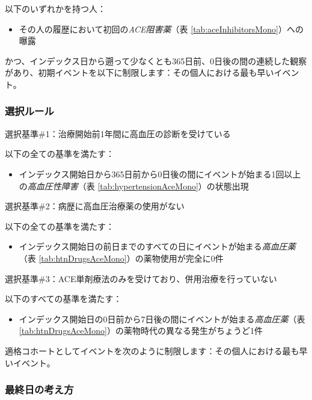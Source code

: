 \documentclass[
  11pt]{book}
\providecommand{\tightlist}{%
  \setlength{\itemsep}{0pt}\setlength{\parskip}{0pt}}
\theoremstyle{definition}
\theoremstyle{definition}
\theoremstyle{definition}
\theoremstyle{definition}
\theoremstyle{remark}
\begin{document}
以下のいずれかを持つ人：

\begin{itemize}
\tightlist
\item
  その人の履歴において初回の\emph{ACE阻害薬}（表 \ref{tab:aceInhibitorsMono}）への曝露
\end{itemize}

かつ、インデックス日から遡って少なくとも365日前、0日後の間の連続した観察があり、初期イベントを以下に制限します：その個人における最も早いイベント。

\subsubsection*{選択ルール}\label{ux9078ux629eux30ebux30fcux30eb}

選択基準\#1：治療開始前1年間に高血圧の診断を受けている

以下の全ての基準を満たす：

\begin{itemize}
\tightlist
\item
  インデックス開始日から365日前から0日後の間にイベントが始まる1回以上の\emph{高血圧性障害}（表 \ref{tab:hypertensionAceMono}）の状態出現
\end{itemize}

選択基準\#2：病歴に高血圧治療薬の使用がない

以下の全ての基準を満たす：

\begin{itemize}
\tightlist
\item
  インデックス開始日の前日までのすべての日にイベントが始まる\emph{高血圧薬}（表 \ref{tab:htnDrugsAceMono}）の薬物使用が完全に0件
\end{itemize}

選択基準\#3：ACE単剤療法のみを受けており、併用治療を行っていない

以下のすべての基準を満たす：

\begin{itemize}
\tightlist
\item
  インデックス開始日の0日前から7日後の間にイベントが始まる\emph{高血圧薬}（表 \ref{tab:htnDrugsAceMono}）の薬物時代の異なる発生がちょうど1件
\end{itemize}

適格コホートとしてイベントを次のように制限します：その個人における最も早いイベント。

\subsubsection*{最終日の考え方}\label{ux6700ux7d42ux65e5ux306eux8003ux3048ux65b9}
\end{document}

